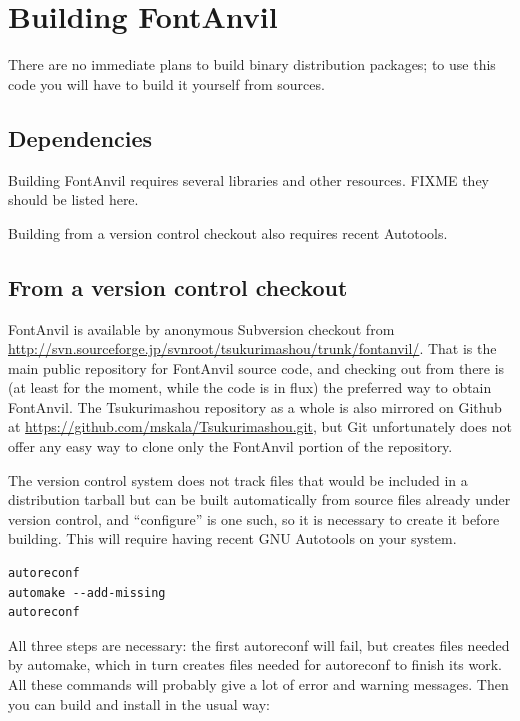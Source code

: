 \documentclass[11pt]{report}
\begin{document}
\chapter{Building FontAnvil}

There are no immediate plans to build binary distribution packages; to use
this code you will have to build it yourself from sources.

\section{Dependencies}

Building FontAnvil requires several libraries and other resources.  FIXME
they should be listed here.

Building from a version control checkout also requires recent Autotools.

\section{From a version control checkout}

FontAnvil is available by anonymous Subversion checkout from
\url{http://svn.sourceforge.jp/svnroot/tsukurimashou/trunk/fontanvil/}. 
That is the main public repository for FontAnvil source code, and checking
out from there is (at least for the moment, while the code is in flux) the
preferred way to obtain FontAnvil.  The Tsukurimashou repository as a whole
is also mirrored on Github at
\url{https://github.com/mskala/Tsukurimashou.git}, but Git unfortunately
does not offer any easy way to clone only the FontAnvil portion of the
repository.

The version control system does not track files that would be included in a
distribution tarball but can be built automatically from source files
already under version control, and ``configure'' is one such, so it is
necessary to create it before building.  This will require having recent GNU
Autotools on your system.

\begin{verbatim}
autoreconf
automake --add-missing
autoreconf
\end{verbatim}

All three steps are necessary:  the first autoreconf will fail, but creates
files needed by automake, which in turn creates files needed for autoreconf
to finish its work.  All these commands will probably give a lot of error
and warning messages.  Then you can build and install in the usual way:
\end{document}
